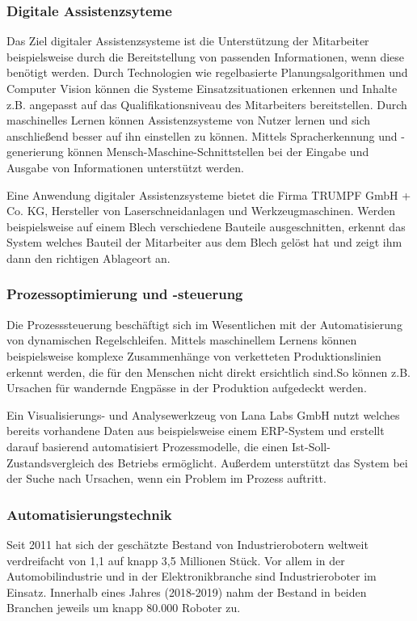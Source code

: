 \documentclass[a4paper,12pt, german]{report}
\begin{document}
\subsubsection{Digitale Assistenzsyteme}
Das Ziel digitaler Assistenzsysteme ist die Unterstützung der Mitarbeiter beispielsweise durch die Bereitstellung von passenden Informationen, wenn diese benötigt werden. Durch Technologien wie
regelbasierte Planungsalgorithmen und Computer Vision können die Systeme Einsatzsituationen erkennen und Inhalte z.B. angepasst auf das Qualifikationsniveau des Mitarbeiters bereitstellen. Durch maschinelles Lernen können Assistenzsysteme von Nutzer lernen und sich anschließend besser auf ihn einstellen zu können. Mittels Spracherkennung und -generierung können Mensch-Maschine-Schnittstellen bei der Eingabe und Ausgabe von Informationen unterstützt werden.

Eine Anwendung digitaler Assistenzsysteme bietet die Firma TRUMPF GmbH + Co. KG, Hersteller von Laserschneidanlagen und Werkzeugmaschinen. Werden beispielsweise auf einem Blech verschiedene Bauteile ausgeschnitten, erkennt das System welches Bauteil der Mitarbeiter aus dem Blech gelöst hat und zeigt ihm dann den richtigen Ablageort an. \cite{24}

\subsubsection{Prozessoptimierung und -steuerung}
Die Prozesssteuerung beschäftigt sich im Wesentlichen mit der Automatisierung von dynamischen Regelschleifen. Mittels maschinellem Lernens können beispielsweise komplexe Zusammenhänge von verketteten Produktionslinien erkennt werden, die für den Menschen nicht direkt ersichtlich sind.So können z.B. Ursachen für wandernde Engpässe in der Produktion aufgedeckt werden.

Ein Visualisierungs- und Analysewerkzeug von Lana Labs GmbH nutzt welches bereits vorhandene Daten aus beispielsweise einem ERP-System und erstellt darauf basierend automatisiert Prozessmodelle, die einen  Ist-Soll-Zustandsvergleich des Betriebs ermöglicht. Außerdem unterstützt das System bei der Suche nach Ursachen, wenn ein Problem im Prozess auftritt. \cite{24}

\subsubsection{Automatisierungstechnik}
Seit 2011 hat sich der geschätzte Bestand von Industrierobotern weltweit verdreifacht von 1,1 auf knapp 3,5 Millionen Stück.\cite{25} Vor allem in der Automobilindustrie und in der Elektronikbranche sind Industrieroboter im Einsatz. Innerhalb eines Jahres (2018-2019) nahm der Bestand in beiden Branchen jeweils um knapp 80.000 Roboter zu.\cite{26}
\end{document}
